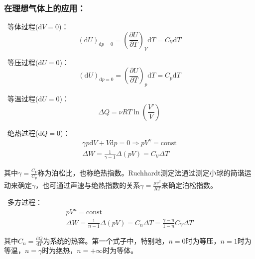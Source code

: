 \documentclass[zihao=5,UTF8]{report}
\begin{document}
\subsubsection{在理想气体上的应用：}
\ 等体过程($\mathrm{d}V = 0$)：
\begin{equation}
    (\mathrm{d}U)_{\mathrm{d}p = 0}  = \left(\frac{\partial U}{\partial T}\right)_V\mathrm{d}T  = C_V \mathrm{d}T 
\end{equation}
\par
{}\ 等压过程($\mathrm{d}U = 0$)：
\begin{equation}
    (\mathrm{d}U)_{\mathrm{d}p = 0}  = \left(\frac{\partial U}{\partial T}\right)_p\mathrm{d}T  = C_p \mathrm{d}T 
\end{equation}
\par
{}\ 等温过程($\mathrm{d}U = 0$)：
\begin{equation}
    \Delta Q = \nu RT \ln (\frac{V'}{V})
\end{equation}

\par
{}\ 绝热过程($\mathrm{d}Q = 0$)：
\begin{gather}
    \gamma p \mathrm{d}V + V\mathrm{d}p = 0 \Longrightarrow p V^{\gamma} = \text{const}\\
    \Delta W = \frac{1}{\gamma -1}\Delta \left(pV\right) = C_V\Delta T
\end{gather}\par
{\color{gray}\small 其中$\gamma = \frac{C_V}{C_p}$称为泊松比，也称绝热指数。Ruchhardt测定法通过测定小球的简谐运动来确定$\gamma$，也可通过声速与绝热指数的关系$\gamma = \frac{\mu v^2}{RT}$来确定泊松指数。}
\par
{}\ 多方过程：
\begin{gather}
    pV^n = \text{const}\\
    \Delta W = \frac{1}{n-1}\Delta \left(pV\right) = C_n\Delta T = \frac{\gamma-n}{1-n}C_V\Delta T
\end{gather}\par
{\color{gray}\small 其中$C_n = \frac{\mathrm{d} Q}{\mathrm{d} T}$为系统的热容。第一个式子中，特别地，$n=0$时为等压，$n=1$时为等温，$n=\gamma$时为绝热，$n=+\infty$时为等体。}
\par
\end{document}
